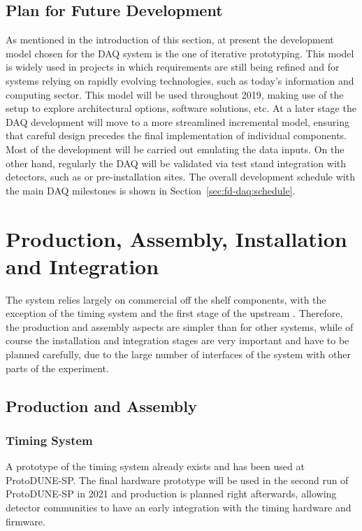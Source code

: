 \subsection{Plan for Future Development}
\label{sec:sp-daq:design-plans}

As mentioned in the introduction of this section, at present the development model chosen for the DAQ system is the one of iterative prototyping.
This model is widely used in projects in which requirements are still being refined and for systems relying on rapidly evolving technologies, such as today’s information and computing sector. 
This model will be used throughout 2019, making use of the  setup to explore architectural options, software solutions, etc.
At a later stage the DAQ development will move to a more streamlined incremental model, ensuring that careful design precedes the final implementation of individual components.
Most of the development will be carried out emulating the data inputs.
On the other hand, regularly the DAQ will be validated via test stand integration with detectors, such as  or pre-installation sites.
The overall development schedule with the main DAQ milestones is shown in Section~\ref{sec:fd-daq:schedule}.


\section{Production, Assembly, Installation and Integration}
\label{sec:sp-daq:production}

The  system relies largely on commercial off the shelf components, with the exception of the timing system and the first stage of the upstream .
Therefore, the production and assembly aspects are simpler than for other systems, while of course the installation and integration stages are very important and have to be planned carefully, due to the large number of interfaces of the  system with other parts of the experiment.

\subsection{Production and Assembly}
\subsubsection{Timing System}
A prototype of the timing system already exists and has been used at ProtoDUNE-SP. The final hardware prototype will be used in the second run of ProtoDUNE-SP in 2021 and production is planned right afterwards, allowing detector communities to have an early integration with the timing hardware and firmware.

